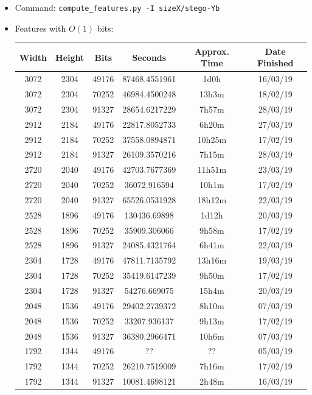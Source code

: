 \documentclass[11pt,a4paper]{report}
\begin{document}
\begin{itemize}
\item Command: \texttt{compute\_features.py -I sizeX/stego-Yb}

\item Features with $O(1)$ bits:
  \begin{center}
  \begin{tabular}{ c c c | c c c }
  Width & Height & Bits & Seconds & Approx. Time & Date Finished \\ \hline
  3072 & 2304 & 49176 & 87468.4551961 & 1d0h & 16/03/19 \\
  3072 & 2304 & 70252 & 46984.4500248 & 13h3m & 18/02/19 \\
  3072 & 2304 & 91327 & 28654.6217229 & 7h57m & 28/03/19 \\
  2912 & 2184 & 49176 & 22817.8052733 & 6h20m & 27/03/19 \\
  2912 & 2184 & 70252 & 37558.0894871 & 10h25m & 17/02/19 \\
  2912 & 2184 & 91327 & 26109.3570216 & 7h15m & 28/03/19 \\
  2720 & 2040 & 49176 & 42703.7677369 & 11h51m & 23/03/19 \\
  2720 & 2040 & 70252 & 36072.916594 & 10h1m & 17/02/19 \\
  2720 & 2040 & 91327 & 65526.0531928 & 18h12m & 22/03/19 \\
  2528 & 1896 & 49176 & 130436.69898 & 1d12h & 20/03/19 \\
  2528 & 1896 & 70252 & 35909.306066 & 9h58m & 17/02/19 \\
  2528 & 1896 & 91327 & 24085.4321764 & 6h41m & 22/03/19 \\
  2304 & 1728 & 49176 & 47811.7135792 & 13h16m & 19/03/19 \\
  2304 & 1728 & 70252 & 35419.6147239 & 9h50m & 17/02/19 \\
  2304 & 1728 & 91327 & 54276.669075 & 15h4m & 20/03/19 \\
  2048 & 1536 & 49176 & 29402.2739372 & 8h10m & 07/03/19 \\
  2048 & 1536 & 70252 & 33207.936137 & 9h13m & 17/02/19 \\
  2048 & 1536 & 91327 & 36380.2966471 & 10h6m & 07/03/19 \\
  1792 & 1344 & 49176 & ?? & ?? & 05/03/19 \\ %
  1792 & 1344 & 70252 & 26210.7519009 & 7h16m & 17/02/19 \\
  1792 & 1344 & 91327 & 10081.4698121 & 2h48m & 16/03/19 \\

\end{tabular}
\end{center}
\end{itemize}
\end{document}
